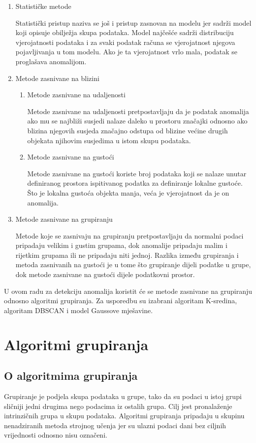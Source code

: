 \documentclass[utf8, diplomski, numeric]{fer}
\begin{document}
\begin{enumerate}
\item Statističke metode

Statistički pristup naziva se još i pristup zasnovan na modelu jer sadrži model koji opisuje obilježja skupa podataka. Model najčešće sadrži distribuciju vjerojatnosti podataka i za svaki podatak računa se vjerojatnost njegova pojavljivanja u tom modelu. Ako je ta vjerojatnost vrlo mala, podatak se proglašava anomalijom.
\item Metode zasnivane na blizini

\begin{enumerate}
\item Metode zasnivane na udaljenosti

Metode zasnivane na udaljenosti pretpostavljaju da je podatak anomalija ako mu se najbliži susjedi nalaze daleko u prostoru značajki odnosno ako blizina njegovih susjeda značajno odstupa od blizine većine drugih objekata njihovim susjedima u istom skupu podataka.
\item Metode zasnivane na gustoći

Metode zasnivane na gustoći koriste broj podataka koji se nalaze unutar definiranog prostora ispitivanog podatka za definiranje lokalne gustoće. Što je lokalna gustoća objekta manja, veća je vjerojatnost da je on anomalija.
\end{enumerate}
\item Metode zasnivane na grupiranju

Metode koje se zasnivaju na grupiranju pretpostavljaju da normalni podaci pripadaju velikim i gustim grupama, dok anomalije pripadaju malim i rijetkim grupama ili ne pripadaju niti jednoj. Razlika između grupiranja i metoda zasnivanih na gustoći je u tome što grupiranje dijeli podatke u grupe, dok metode zasnivane na gustoći dijele podatkovni prostor.
\end{enumerate}
U ovom radu za detekciju anomalija koristit će se metode zasnivane na grupiranju odnosno algoritmi grupiranja. Za usporedbu su izabrani algoritam K-sredina, algoritam DBSCAN i model Gaussove mješavine.


\chapter{Algoritmi grupiranja}
\section{O algoritmima grupiranja}
Grupiranje je podjela skupa podataka u grupe, tako da su podaci u istoj grupi sličniji jedni drugima nego podacima iz ostalih grupa. Cilj jest pronalaženje intrinzičnih grupa u skupu podataka. Algoritmi grupiranja pripadaju u skupinu nenadziranih metoda strojnog učenja jer su ulazni podaci dani bez ciljnih vrijednosti odnosno nisu označeni. 
\end{document}

